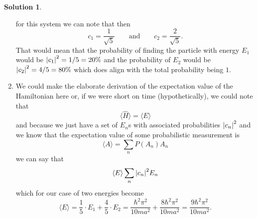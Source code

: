 \documentclass[10pt]{article}
\theoremstyle{definition}
\newtheorem{soln}{Solution}
\begin{document}
\begin{soln}
\begin{enumerate}[label=(\alph*)]
          for this system we can note that then
          $$c_1=\frac{1}{\sqrt{5}}\qquad\text{and}\qquad c_2=\frac{2}{\sqrt{5}}.$$
          That would mean that the probability of finding the particle with energy $E_1$
          would be $\abs{c_1}^2=1/5=20\%$ and the probability of $E_2$ would be
          $\abs{c_2}^2=4/5=80\%$ which does align with the total probability being $1$.
    \item We could make the elaborate derivation of the expectation value of the Hamiltonian here
          or, if we were short on time (hypothetically), we could note that
          $$\langle \hat{H} \rangle=\langle E \rangle$$
          and because we just have a set of $E_n$s with associated probabilities $\abs{c_n}^2$
          and we know that the expectation value of some probabilistic measurement is
          $$\langle A\rangle=\sum_{n}P(A_n)A_n$$
          we can say that
          $$\langle E \rangle \sum_{n}\abs{c_n}^2E_n$$
          which for our case of two energies become
          $$\langle E \rangle =\frac{1}{5}\cdot E_1+\frac{4}{5}\cdot E_2=
            \frac{\hbar^2\pi^2}{10ma^2}+\frac{8\hbar^2\pi^2}{10ma^2}
            =\frac{9\hbar^2\pi^2}{10ma^2}.$$
  \end{enumerate}
\end{soln}
\end{document}
